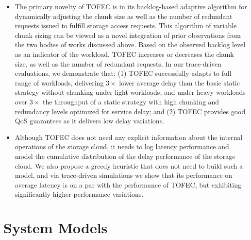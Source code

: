 \documentclass[journal]{IEEEtran}
\newcommand{\comment}[1]{}
\newcommand{\ourproposal}{TOFEC\xspace}
\begin{document}
\begin{itemize}
\item The primary novelty of \ourproposal is in its backlog-based adaptive algorithm for dynamically adjusting the chunk size as well as the number of redundant requests issued to fulfill storage access requests. This algorithm of variable chunk sizing can be viewed as a novel integration of prior observations from the two bodies of works discussed above. Based on the observed backlog level as an indicator of the workload, \ourproposal increases or decreases the chunk size, as well as the number of redundant requests. In our trace-driven evaluations, we demonstrate that: (1) \ourproposal successfully adapts to full range of workloads, delivering $3\times$ lower average delay than the basic static strategy without chunking under light workloads, and under heavy workloads over $3\times$ the throughput of a static strategy with high chunking and redundancy levels optimized for service delay; and (2) \ourproposal provides good QoS guarantees as it delivers low delay variations.


\comment{
\ourproposal works without any explicit information from the back-end cloud storage implementation: its adaptation strategy is implemented solely at the front-end application server (the storage client) and is based exclusively on the measured latency from unmodified cloud storage systems. This allows \ourproposal to be more easily deployed, as individual cloud applications can adopt \ourproposal without being tied-up with any particular cloud storage system, as long as a small number of APIs are provided by 
most existing popular cloud storage systems such as Amazon S3 and Microsoft's Azure Storage.
}

\item Although \ourproposal does not need any explicit information about the internal operations of the storage cloud, it needs to log latency performance and model the cumulative distribution of the delay performance of the storage cloud. We also propose a greedy heuristic that does not need to build such a model, and via trace-driven simulations we show that its performance on average latency is on a par with the performance of \ourproposal, but exhibiting significantly higher performance variations.

\end{itemize}

\section{System Models}
\label{sec:system}
\end{document}
